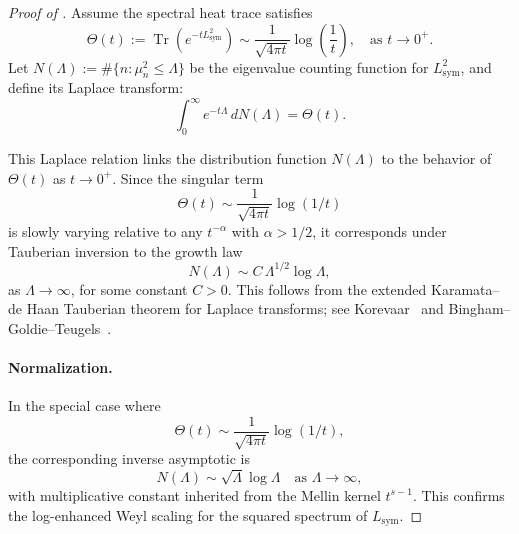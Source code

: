 \begin{proof}[Proof of ]
Assume the spectral heat trace satisfies
\[
\Theta(t) := \operatorname{Tr}(e^{-t L_{\mathrm{sym}}^2}) \sim \frac{1}{\sqrt{4\pi t}} \log\left( \frac{1}{t} \right), \quad \text{as } t \to 0^+.
\]
Let \( N(\Lambda) := \#\{ n : \mu_n^2 \le \Lambda \} \) be the eigenvalue counting function for \( L_{\mathrm{sym}}^2 \), and define its Laplace transform:
\[
\int_0^\infty e^{-t \Lambda} \, dN(\Lambda) = \Theta(t).
\]

This Laplace relation links the distribution function \( N(\Lambda) \) to the behavior of \( \Theta(t) \) as \( t \to 0^+ \). Since the singular term
\[
\Theta(t) \sim \frac{1}{\sqrt{4\pi t}} \log(1/t)
\]
is slowly varying relative to any \( t^{-\alpha} \) with \( \alpha > 1/2 \), it corresponds under Tauberian inversion to the growth law
\[
N(\Lambda) \sim C \, \Lambda^{1/2} \log \Lambda,
\]
as \( \Lambda \to \infty \), for some constant \( C > 0 \). This follows from the extended Karamata–de Haan Tauberian theorem for Laplace transforms; see Korevaar~\cite[Thm.~4.12.9]{Korevaar2004Tauberian} and Bingham–Goldie–Teugels~\cite[Thm.~1.7.1]{BGT1989RegularVariation}.

\paragraph{Normalization.}
In the special case where
\[
\Theta(t) \sim \frac{1}{\sqrt{4\pi t}} \log(1/t),
\]
the corresponding inverse asymptotic is
\[
N(\Lambda) \sim \sqrt{\Lambda} \log \Lambda \quad \text{as } \Lambda \to \infty,
\]
with multiplicative constant inherited from the Mellin kernel \( t^{s - 1} \). This confirms the log-enhanced Weyl scaling for the squared spectrum of \( L_{\mathrm{sym}} \).
\end{proof}
